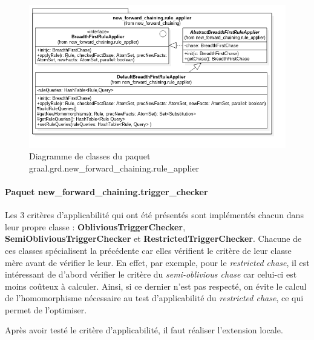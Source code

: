        \begin{figure}[h]
        \centering
        \includegraphics[width=\textwidth]{pictures/new_forward_chaining-rule_applier.png}
        \vspace{-30pt}
        \caption{Diagramme de classes du paquet graal.grd.new\_forward\_chaining.rule\_applier}
        \label{fig:new_forward_chaining.rule_applier}
        \end{figure}
       
       \paragraph{Paquet new\_forward\_chaining.trigger\_checker} Les 3 critères d'applicabilité qui ont été présentés sont implémentés chacun dans leur propre classe : \textbf{ObliviousTriggerChecker}, \textbf{SemiObliviousTriggerChecker} et \textbf{RestrictedTriggerChecker}. Chacune de ces classes spécialisent la précédente car elles vérifient le critère de leur classe mère avant de vérifier le leur. En effet, par exemple, pour le \textit{restricted chase}, il est intéressant de d'abord vérifier le critère du \textit{semi-oblivious chase} car celui-ci est moins coûteux à calculer. Ainsi, si ce dernier n'est pas respecté, on évite le calcul de l'homomorphisme nécessaire au test d'applicabilité du \textit{restricted chase}, ce qui permet de l'optimiser. 
       \par Après avoir testé le critère d'applicabilité, il faut réaliser l'extension locale.
       
